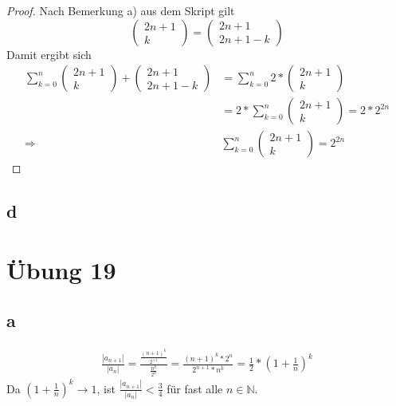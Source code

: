 \documentclass[a4paper,10pt]{article}
\begin{document}
\begin{proof}
 Nach Bemerkung a) aus dem Skript gilt
 \begin{equation}
  \begin{pmatrix}2n + 1\\k\end{pmatrix} = \begin{pmatrix}2n + 1\\2n + 1 - k\end{pmatrix}
 \end{equation}
 Damit ergibt sich
 \begin{align}
  \sum_{k = 0}^{n} \begin{pmatrix}2n + 1\\k\end{pmatrix} + \begin{pmatrix}2n + 1\\2n + 1 - k\end{pmatrix} & = \sum_{k = 0}^{n} 2 * \begin{pmatrix}2n + 1\\k\end{pmatrix}\\
  & = 2 * \sum_{k = 0}^{n} \begin{pmatrix}2n + 1\\k\end{pmatrix} = 2 * 2^{2n}\\
  \Rightarrow & \sum_{k = 0}^{n} \begin{pmatrix}2n + 1\\k\end{pmatrix} = 2^{2n}
 \end{align}
\end{proof}

\subsection*{d}



\section*{Übung 19}

\subsection*{a}

\begin{align}
 \frac{|a_{n + 1}|}{|a_n|} = \frac{\frac{(n + 1)^k}{2^{ + 1}}}{\frac{n^k}{2^n}} = \frac{(n + 1)^k * 2^n}{2^{n + 1} * n^k} = \frac{1}{2} * (1 + \frac{1}{n})^k
\end{align}
Da $(1 + \frac{1}{n})^k \rightarrow 1$, ist $\frac{|a_{n + 1}|}{|a_n|} < \frac{3}{4}$ für fast alle $n \in \mathbb{N}$.
\end{document}
